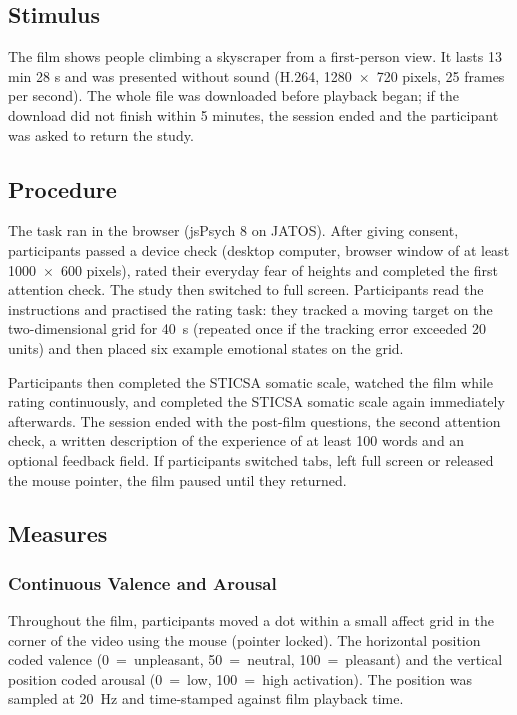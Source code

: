 \documentclass[man,floatsintext,12pt,donotrepeattitle]{apa7}
\begin{document}
\subsection{Stimulus}

The film shows people climbing a skyscraper from a first-person view. It lasts 13 min 28 s and was presented without
sound (H.264, 1280~$\times$~720 pixels, 25 frames per second). The whole file was downloaded before playback began;
if the download did not finish within 5 minutes, the session ended and the participant was asked to return the
study.

\subsection{Procedure}

The task ran in the browser (jsPsych 8 on JATOS). After giving consent, participants passed a device check (desktop
computer, browser window of at least 1000~$\times$~600 pixels), rated their everyday fear of heights and completed
the first attention check. The study then switched to full screen. Participants read the instructions and practised
the rating task: they tracked a moving target on the two-dimensional grid for 40~s (repeated once if the tracking
error exceeded 20 units) and then placed six example emotional states on the grid.

Participants then completed the STICSA somatic scale, watched the film while rating continuously, and completed the
STICSA somatic scale again immediately afterwards. The session ended with the post-film questions, the second
attention check, a written description of the experience of at least 100 words and an optional feedback field. If
participants switched tabs, left full screen or released the mouse pointer, the film paused until they returned.

\subsection{Measures}

\subsubsection{Continuous Valence and Arousal}

Throughout the film, participants moved a dot within a small affect grid in the corner of the video using the mouse
(pointer locked). The horizontal position coded valence (0~=~unpleasant, 50~=~neutral, 100~=~pleasant) and the
vertical position coded arousal (0~=~low, 100~=~high activation). The position was sampled at 20~Hz and time-stamped
against film playback time.
\end{document}
